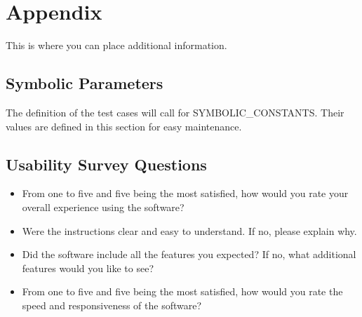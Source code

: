 \documentclass[12pt, titlepage]{article}
\begin{document}
\newpage

\section{Appendix}

This is where you can place additional information.

\subsection{Symbolic Parameters}

The definition of the test cases will call for SYMBOLIC\_CONSTANTS.
Their values are defined in this section for easy maintenance.

\subsection{Usability Survey Questions}\label{USQ}
\begin{itemize}
\item From one to five and five being the most satisfied, how would you rate your overall experience using the software?
\item Were the instructions clear and easy to understand. If no, please explain why.
\item Did the software include all the features you expected? If no, what additional features would you like to see?
\item From one to five and five being the most satisfied, how would you rate the speed and responsiveness of the software?
\end{itemize}
\end{document}
